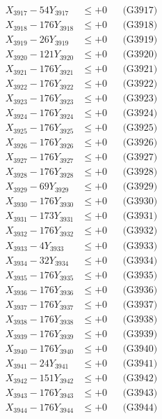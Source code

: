 \documentclass[a4paper,10pt]{article}
\begin{document}
{\begin{align}
X_{3917} - 54Y_{3917} &\leq +0 && \text{(G3917)} \\
X_{3918} - 176Y_{3918} &\leq +0 && \text{(G3918)} \\
X_{3919} - 26Y_{3919} &\leq +0 && \text{(G3919)} \\
X_{3920} - 121Y_{3920} &\leq +0 && \text{(G3920)} \\
\allowbreak
X_{3921} - 176Y_{3921} &\leq +0 && \text{(G3921)} \\
X_{3922} - 176Y_{3922} &\leq +0 && \text{(G3922)} \\
X_{3923} - 176Y_{3923} &\leq +0 && \text{(G3923)} \\
X_{3924} - 176Y_{3924} &\leq +0 && \text{(G3924)} \\
X_{3925} - 176Y_{3925} &\leq +0 && \text{(G3925)} \\
X_{3926} - 176Y_{3926} &\leq +0 && \text{(G3926)} \\
X_{3927} - 176Y_{3927} &\leq +0 && \text{(G3927)} \\
X_{3928} - 176Y_{3928} &\leq +0 && \text{(G3928)} \\
X_{3929} - 69Y_{3929} &\leq +0 && \text{(G3929)} \\
X_{3930} - 176Y_{3930} &\leq +0 && \text{(G3930)} \\
\allowbreak
X_{3931} - 173Y_{3931} &\leq +0 && \text{(G3931)} \\
X_{3932} - 176Y_{3932} &\leq +0 && \text{(G3932)} \\
X_{3933} - 4Y_{3933} &\leq +0 && \text{(G3933)} \\
X_{3934} - 32Y_{3934} &\leq +0 && \text{(G3934)} \\
X_{3935} - 176Y_{3935} &\leq +0 && \text{(G3935)} \\
X_{3936} - 176Y_{3936} &\leq +0 && \text{(G3936)} \\
X_{3937} - 176Y_{3937} &\leq +0 && \text{(G3937)} \\
X_{3938} - 176Y_{3938} &\leq +0 && \text{(G3938)} \\
X_{3939} - 176Y_{3939} &\leq +0 && \text{(G3939)} \\
X_{3940} - 176Y_{3940} &\leq +0 && \text{(G3940)} \\
\allowbreak
X_{3941} - 24Y_{3941} &\leq +0 && \text{(G3941)} \\
X_{3942} - 151Y_{3942} &\leq +0 && \text{(G3942)} \\
X_{3943} - 176Y_{3943} &\leq +0 && \text{(G3943)} \\
X_{3944} - 176Y_{3944} &\leq +0 && \text{(G3944)} \\

\end{align}}
\end{document}
